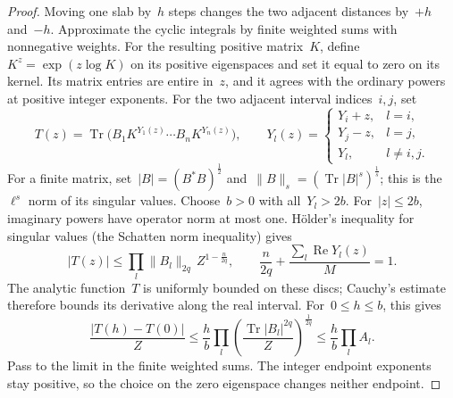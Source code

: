 \begin{proof}
Moving one slab by~$h$ steps changes the two adjacent distances by~$+h$ and~$-h$.
Approximate the cyclic integrals by finite weighted sums with nonnegative weights.
For the resulting positive matrix~$K$, define~$K^z=\exp(z\log K)$ on its positive eigenspaces and set it equal to zero on its kernel.
Its matrix entries are entire in~$z$, and it agrees with the ordinary powers at positive integer exponents.
For the two adjacent interval indices~$i,j$, set
\begin{equation*}
 T(z)=\operatorname{Tr}\bigl(B_1K^{Y_1(z)}\cdots B_nK^{Y_n(z)}\bigr),
 \qquad
 Y_l(z)=\begin{cases}Y_i+z,&l=i,\\Y_j-z,&l=j,\\Y_l,&l\ne i,j.\end{cases}
\end{equation*}
For a finite matrix, set~$|B|=(B^*B)^{\frac{1}{2}}$ and~$\|B\|_s=(\operatorname{Tr}|B|^s)^{\frac{1}{s}}$; this is the~$\ell^s$ norm of its singular values.
Choose~$b>0$ with all~$Y_l>2b$.
For~$|z|\le2b$, imaginary powers have operator norm at most one. H\"older's inequality for singular values (the Schatten norm inequality) gives
\begin{equation*}
 |T(z)|\le\prod_l\|B_l\|_{2q}\,Z^{1-\frac{n}{2q}},
 \qquad
 \frac{n}{2q}+\frac{\sum_l\operatorname{Re}Y_l(z)}{M}=1.
\end{equation*}
The analytic function~$T$ is uniformly bounded on these discs; Cauchy’s estimate therefore bounds its derivative along the real interval. For~$0\le h\le b$, this gives
\begin{equation*}
 \frac{|T(h)-T(0)|}{Z}
 \le\frac{h}{b}
       \prod_l\left(\frac{\operatorname{Tr}|B_l|^{2q}}{Z}\right)^{\frac{1}{2q}}
 \le\frac{h}{b}\prod_l A_l.
\end{equation*}
Pass to the limit in the finite weighted sums.
The integer endpoint exponents stay positive, so the choice on the zero eigenspace changes neither endpoint.


\end{proof}
